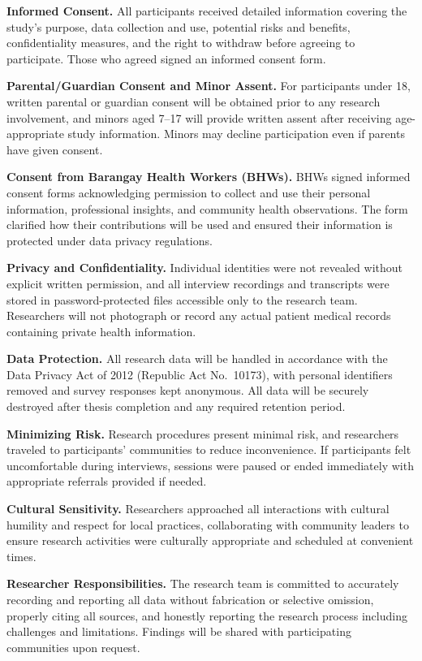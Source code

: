 \documentclass{research}
\begin{document}
\textbf{Informed Consent.} All participants received detailed information covering the study's
purpose, data collection and use, potential risks and benefits, confidentiality measures, and the
right to withdraw before agreeing to participate. Those who agreed signed an informed consent
form.

\textbf{Parental/Guardian Consent and Minor Assent.} For participants under 18, written parental
or guardian consent will be obtained prior to any research involvement, and minors aged 7--17
will provide written assent after receiving age-appropriate study information. Minors may decline
participation even if parents have given consent.

\textbf{Consent from Barangay Health Workers (BHWs).} BHWs signed informed consent forms
acknowledging permission to collect and use their personal information, professional insights, and
community health observations. The form clarified how their contributions will be used and ensured
their information is protected under data privacy regulations.

\textbf{Privacy and Confidentiality.} Individual identities were not revealed without explicit
written permission, and all interview recordings and transcripts were stored in password-protected
files accessible only to the research team. Researchers will not photograph or record any actual
patient medical records containing private health information.

\textbf{Data Protection.} All research data will be handled in accordance with the Data Privacy
Act of 2012 (Republic Act No.\ 10173), with personal identifiers removed and survey responses
kept anonymous. All data will be securely destroyed after thesis completion and any required
retention period.

\textbf{Minimizing Risk.} Research procedures present minimal risk, and researchers traveled to
participants' communities to reduce inconvenience. If participants felt uncomfortable during
interviews, sessions were paused or ended immediately with appropriate referrals provided if
needed.

\textbf{Cultural Sensitivity.} Researchers approached all interactions with cultural humility and
respect for local practices, collaborating with community leaders to ensure research activities
were culturally appropriate and scheduled at convenient times.

\textbf{Researcher Responsibilities.} The research team is committed to accurately recording and
reporting all data without fabrication or selective omission, properly citing all sources, and
honestly reporting the research process including challenges and limitations. Findings will be
shared with participating communities upon request.
\end{document}
